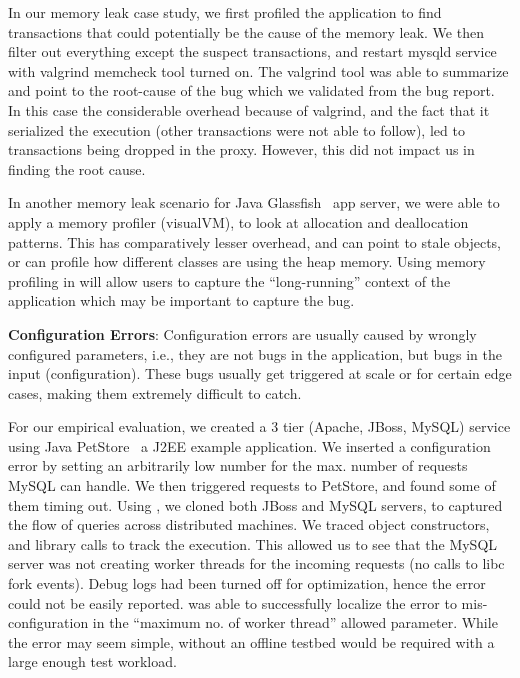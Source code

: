 In our memory leak case study, we first profiled the application to find transactions that could potentially be the cause of the memory leak. 
We then filter out everything except the suspect transactions, and restart mysqld service with valgrind memcheck tool turned on.
The valgrind tool was able to summarize and point to the root-cause of the bug which we validated from the bug report.
In this case the considerable overhead because of valgrind, and the fact that it serialized the execution (other transactions were not able to follow), led to transactions being dropped in the proxy. 
However, this did not impact us in finding the root cause.

In another memory leak scenario for Java Glassfish~\cite{glassfish} app server, we were able to apply a memory profiler (visualVM), to look at allocation and deallocation patterns.
This has comparatively lesser overhead, and can point to stale objects, or can profile how different classes are using the heap memory.
Using memory profiling in \parikshan will allow users to capture the ``long-running'' context of the application which may be important to capture the bug.
\fi

\noindent
\textbf{Configuration Errors}:
Configuration errors are usually caused by wrongly configured parameters, i.e., they are not bugs in the application, but bugs in the input (configuration).
These bugs usually get triggered at scale or for certain edge cases, making them extremely difficult to catch.

For our empirical evaluation, we created a 3 tier (Apache, JBoss, MySQL) service using Java PetStore~\cite{petstore} a J2EE example application.
We inserted a configuration error by setting an arbitrarily low number for the max. number of requests MySQL can handle.
We then triggered requests to PetStore, and found some of them timing out.
Using \parikshan, we cloned both JBoss and MySQL servers, to captured the flow of queries across distributed machines.
We traced object constructors, and library calls to track the execution.
This allowed us to see that the MySQL server was not creating worker threads for the incoming requests (no calls to libc fork events).
Debug logs had been turned off for optimization, hence the error could not be easily reported. 
\parikshan was able to successfully localize the error to mis-configuration in the ``maximum no. of worker thread'' allowed parameter.
While the error may seem simple, without \parikshan an offline testbed would be required with a large enough test workload.


